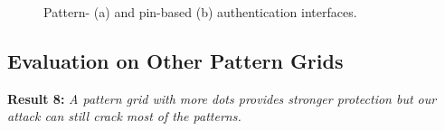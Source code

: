         \begin{figure}[!t]
            \centering
            \hspace{0.2cm}
            \caption{Pattern- (a) and pin-based (b) authentication interfaces.}
            \label{fig:unlock interface}
        \end{figure}

    \subsection{Evaluation on Other Pattern Grids\label{sec:scalability}}
    \noindent \textbf{Result 8:} \emph{A pattern grid with more dots provides stronger protection but our attack can still crack most of the patterns.}

